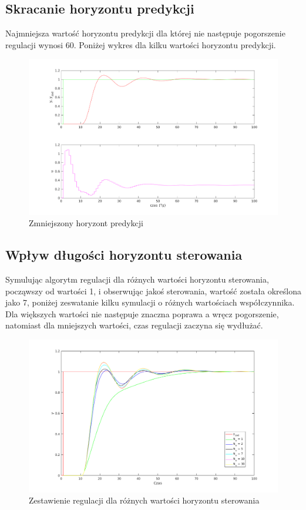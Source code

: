 \documentclass[a4paper, 11pt]{article}
\begin{document}
\subsection{Skracanie horyzontu predykcji}
Najmniejsza wartość horyzontu predykcji dla której nie następuje pogorszenie regulacji wynosi 60. Poniżej wykres dla kilku wartości horyzontu predykcji. 
\begin{figure}[H]
\centering
\includegraphics[scale=0.60]{horyzont_predykcji_skracanie.png}
\caption{Zmniejszony horyzont predykcji}
\end{figure}

\subsection{Wpływ długości horyzontu sterowania}
Symulując algorytm regulacji dla różnych wartości horyzontu sterowania, począwszy od wartości 1, i obserwując jakoś sterowania, wartość została określona jako 7, poniżej zeswatanie kilku symulacji o różnych wartościach współczynnika. Dla większych wartości nie następuje znaczna poprawa a wręcz pogorszenie, natomiast dla mniejszych wartości, czas regulacji zaczyna się wydłużać. 
\begin{figure}[H]
\centering
\includegraphics[scale=0.60]{horyzont_sterowania.png}
\caption{Zestawienie regulacji dla różnych wartości horyzontu sterowania}

\end{figure}
\end{document}
